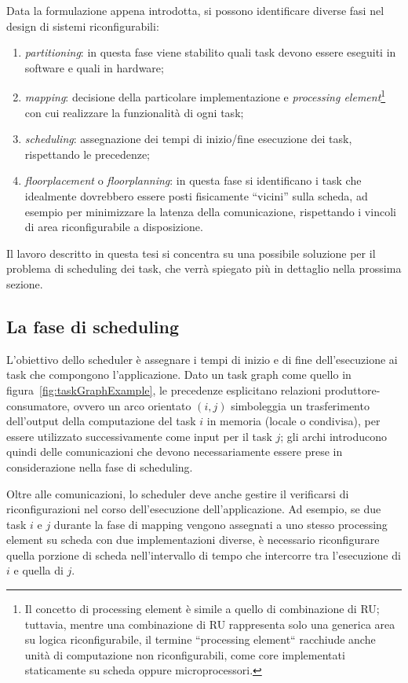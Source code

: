 Data la formulazione appena introdotta, si possono identificare diverse fasi nel
design di sistemi riconfigurabili:
\begin{enumerate}
 \item \emph{partitioning}: in questa fase viene stabilito quali task devono essere
 eseguiti in software e quali in hardware;
 \item \emph{mapping}: decisione della particolare implementazione e \emph{processing
 element}\footnote{Il concetto di processing element è simile a quello di combinazione
 di \ac{RU}; tuttavia, mentre una combinazione di \ac{RU} rappresenta solo una generica
 area su logica riconfigurabile, il termine ``processing element`` racchiude anche unità
 di computazione non riconfigurabili, come core implementati staticamente su scheda oppure
 microprocessori.}
 con cui realizzare la funzionalità di ogni task;
 \item \emph{scheduling}: assegnazione dei tempi di inizio/fine esecuzione dei task,
 rispettando le precedenze;
 \item \emph{floorplacement} o \emph{floorplanning}: in questa fase si identificano i 
task che idealmente dovrebbero essere posti fisicamente ``vicini'' sulla scheda, ad 
esempio per minimizzare la latenza della comunicazione, rispettando i vincoli di area 
riconfigurabile a disposizione.
\end{enumerate}
Il lavoro descritto in questa tesi si concentra su una possibile soluzione per il 
problema di scheduling dei task, che verrà spiegato più in dettaglio nella prossima 
sezione.


\subsection{La fase di scheduling}
\label{subsec:faseSchedulingIntro}
L'obiettivo dello scheduler è assegnare i tempi di inizio e di fine dell'esecuzione ai
task che compongono l'applicazione. Dato un task graph come quello in
figura~\ref{fig:taskGraphExample}, le precedenze esplicitano relazioni produttore-consumatore,
ovvero un arco orientato $(i,j)$ simboleggia un trasferimento dell'output della
computazione del task $i$ in memoria (locale o condivisa), per essere utilizzato
successivamente come input per il task $j$; gli archi introducono quindi delle
comunicazioni che devono necessariamente essere prese in considerazione nella fase 
di scheduling.

Oltre alle comunicazioni, lo scheduler deve anche gestire il verificarsi di 
riconfigurazioni nel corso dell'esecuzione dell'applicazione. Ad esempio, se due task $i$ 
e $j$ durante la fase di mapping vengono assegnati a uno stesso processing element su 
scheda con due implementazioni diverse, è necessario riconfigurare quella porzione di 
scheda nell'intervallo di tempo che intercorre tra l'esecuzione di $i$ e quella di $j$.

